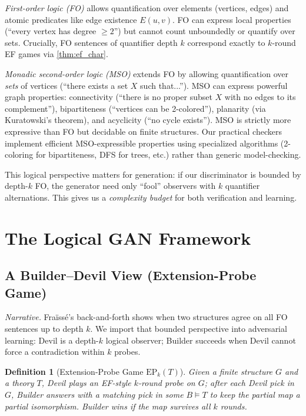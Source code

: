 \documentclass{article}
\newtheorem{definition}[theorem]{Definition}
\begin{document}
\emph{First-order logic (FO)} allows quantification over elements (vertices, edges) and atomic predicates like edge existence $E(u,v)$. FO can express local properties (``every vertex has degree $\ge 2$'') but cannot count unboundedly or quantify over sets. Crucially, FO sentences of quantifier depth $k$ correspond exactly to $k$-round EF games via \cref{thm:ef_char}.

\emph{Monadic second-order logic (MSO)} extends FO by allowing quantification over \emph{sets} of vertices (``there exists a set $X$ such that...'').  MSO can express powerful graph properties: connectivity (``there is no proper subset $X$ with no edges to its complement''), bipartiteness (``vertices can be 2-colored''), planarity (via Kuratowski's theorem), and acyclicity (``no cycle exists''). MSO is strictly more expressive than FO but decidable on finite structures. Our practical checkers implement efficient MSO-expressible properties using specialized algorithms (2-coloring for bipartiteness, DFS for trees, etc.) rather than generic model-checking.

This logical perspective matters for generation: if our discriminator is bounded by depth-$k$ FO, the generator need only ``fool'' observers with $k$ quantifier alternations. This gives us a \emph{complexity budget} for both verification and learning.

\section{The Logical GAN Framework}

\subsection{A Builder--Devil View (Extension-Probe Game)}
\label{sec:builder-devil}

\textit{Narrative.}
Fra\"iss\'e's back-and-forth shows when two structures agree on all FO sentences up to depth $k$.
We import that bounded perspective into adversarial learning: Devil is a depth-$k$ logical observer; Builder succeeds when Devil cannot force a contradiction within $k$ probes.

\begin{definition}[Extension-Probe Game $\mathrm{EP}_k(T)$]
Given a finite structure $G$ and a theory $T$, Devil plays an EF-style $k$-round probe on $G$; after each Devil pick in $G$, Builder answers with a matching pick in \emph{some} $B\models T$ to keep the partial map a partial isomorphism. Builder wins if the map survives all $k$ rounds.
\end{definition}
\end{document}
